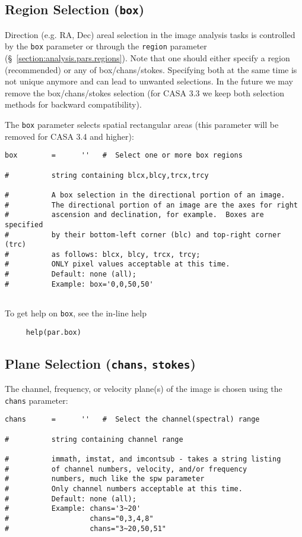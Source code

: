 \subsection{Region Selection ({\tt box})}
\label{section:analysis.pars.box}

Direction (e.g. RA, Dec) areal selection in the image analysis tasks is
controlled by the {\tt box} parameter or through the {\tt region}
parameter (\S~\ref{section:analysis.pars.regions}). Note that one
should either specify a region (recommended) or any of
box/chans/stokes. Specifying both at the same time is not unique
anymore and can lead to unwanted selections. In the future we may
remove the box/chans/stokes selection (for CASA 3.3 we 
keep both selection methods for backward compatibility).

The {\tt box} parameter selects spatial rectangular areas (this parameter will
be removed for CASA 3.4 and higher):
\small
\begin{verbatim}
box        =      ''   #  Select one or more box regions

#          string containing blcx,blcy,trcx,trcy

#          A box selection in the directional portion of an image.
#          The directional portion of an image are the axes for right
#          ascension and declination, for example.  Boxes are specified
#          by their bottom-left corner (blc) and top-right corner (trc)
#          as follows: blcx, blcy, trcx, trcy;
#          ONLY pixel values acceptable at this time.
#          Default: none (all);
#          Example: box='0,0,50,50'


\end{verbatim}
\normalsize

To get help on {\tt box}, see the in-line help
\small
\begin{verbatim}
     help(par.box)
\end{verbatim}
\normalsize

\subsection{Plane Selection ({\tt chans}, {\tt stokes})}
\label{section:analysis.pars.planes}

The channel, frequency, or velocity plane(s) of the image is chosen
using the {\tt chans} parameter:
\small
\begin{verbatim}
chans      =      ''   #  Select the channel(spectral) range

#          string containing channel range

#          immath, imstat, and imcontsub - takes a string listing
#          of channel numbers, velocity, and/or frequency
#          numbers, much like the spw parameter
#          Only channel numbers acceptable at this time.
#          Default: none (all);  
#          Example: chans='3~20'    
#                   chans="0,3,4,8"
#                   chans="3~20,50,51"
\end{verbatim}
\normalsize


